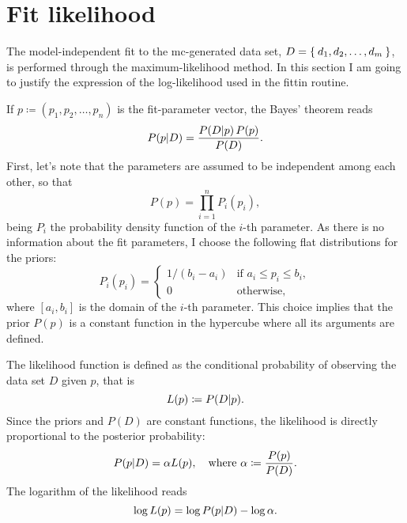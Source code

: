 \section{Fit likelihood}

    The model-independent fit to the \ac{mc}-generated data set, $D = \Set{d_1, d_2,\dots, d_m}$, is performed through the maximum-likelihood method.
    In this section I am going to justify the expression of the log-likelihood used in the fittin routine.

    If $p \coloneqq (p_1, p_2,\dots, p_n)$ is the fit-parameter vector, the Bayes' theorem reads
    \begin{equation}
        P(p\vert D) = \frac{P(D\vert p)\, P(p)}{P(D)}.
    \end{equation}
    First, let's note that the parameters are assumed to be independent among each other, so that
    \begin{equation}
        P(p) = \prod_{i = 1}^n P_i(p_i),
    \end{equation}
    being $P_i$ the probability density function of the $i$-th parameter.
    As there is no information about the fit parameters, I choose the following flat distributions for the priors:
    \begin{equation}\label{eq:flat_priors}
        P_i(p_i) =
        \begin{cases}
            1/(b_i - a_i) & \text{if } a_i \le p_i \le b_i, \\
            0             & \text{otherwise},
        \end{cases}
    \end{equation}
    where $[a_i, b_i]$ is the domain of the $i$-th parameter.
    This choice implies that the prior $P(p)$ is a constant function in the hypercube where all its arguments are defined.

    The likelihood function is defined as the conditional probability of observing the data set $D$ given $p$, that is
    \begin{equation}
        L(p) \coloneqq P(D\vert p).
    \end{equation}
    Since the priors and $P(D)$ are constant functions, the likelihood is directly proportional to the posterior probability:
    \begin{equation}
        P(p\vert D) = \alpha L(p),\quad \text{where } \alpha \coloneqq \frac{P(p)}{P(D)}.
    \end{equation}
    The logarithm of the likelihood reads
    \begin{equation}
        \log L(p) = \log P(p\vert D) - \log \alpha.
    \end{equation}


